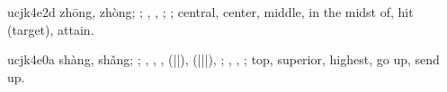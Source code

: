 \begin{multicols}{2}
{{\mktsStyleMidashi{}\cjkgGlue{}}{\mktsStyleFncr{}u\cjkgGlue{}cjk\cjkgGlue{}4e2d} zhōng, zhòng; \cjkgGlue{}; \cjkgGlue{}, \cjkgGlue{}, \cjkgGlue{}\cjkgGlue{}\cjkgGlue{}; \cjkgGlue{}; {\mktsStyleGloss{}central, center, middle, in the midst of, hit (target), attain}.

{\mktsStyleMidashi{}\cjkgGlue{}}{\mktsStyleFncr{}u\cjkgGlue{}cjk\cjkgGlue{}4e0a} shàng, shǎng; \cjkgGlue{}; \cjkgGlue{}, \cjkgGlue{}, \cjkgGlue{}, \cjkgGlue{}\cjkgGlue{}(\cjkgGlue{}|\cjkgGlue{}|\cjkgGlue{}), \cjkgGlue{}\cjkgGlue{}(\cjkgGlue{}|\cjkgGlue{}|\cjkgGlue{}|\cjkgGlue{}), \cjkgGlue{}\cjkgGlue{}\cjkgGlue{}; \cjkgGlue{}, \cjkgGlue{}, \cjkgGlue{}; {\mktsStyleGloss{}top, superior, highest, go up, send up}.

}



\end{multicols}




